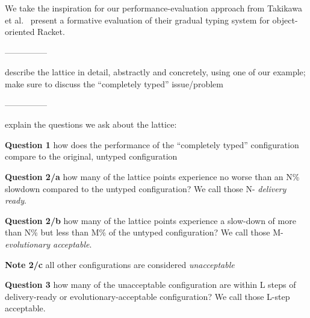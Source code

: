 
We take the inspiration for our performance-evaluation approach from
 Takikawa et al.~\cite{asumu:practical} present a formative evaluation of
 their gradual typing system for object-oriented Racket. 

 ---------------

describe the lattice in detail, abstractly and concretely, using one of our
example; make sure to discuss the ``completely typed'' issue/problem 

---------------

explain the questions we ask about the lattice: 

{\bf Question 1} how does the performance of the ``completely typed'' configuration
compare to the original, untyped configuration 

{\bf Question 2/a} how many of the lattice points experience no worse than an N\%
slowdown compared to the untyped configuration? We call those N-{\it
delivery ready\/}.

{\bf Question 2/b} how many of the lattice points experience a slow-down of more
than N\% but less than M\% of the untyped configuration? We call those
M-{\it evolutionary acceptable\/}.

{\bf Note 2/c} all other configurations are considered {\it unacceptable\/}

{\bf Question 3} how many of the unacceptable configuration are within L
steps of delivery-ready or evolutionary-acceptable configuration? We call
those L-step acceptable. 


